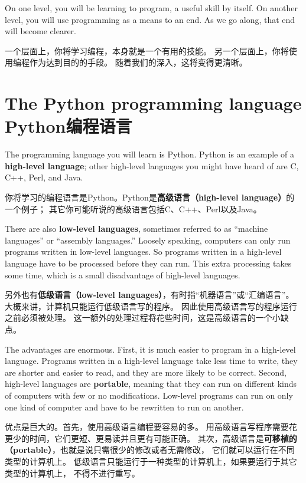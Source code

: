 \documentclass[10pt]{book}
\begin{document}
\begin{CJK}{UTF8}{gbsn}
On one level, you will be learning to program, a useful
skill by itself.  On another level, you will use programming as a means to
an end.  As we go along, that end will become clearer.

一个层面上，你将学习编程，本身就是一个有用的技能。
另一个层面上，你将使用编程作为达到目的的手段。
随着我们的深入，这将变得更清晰。

\section{The Python programming language Python编程语言}

The programming language you will learn is Python. Python is
an example of a {\bf high-level language}; other high-level languages
you might have heard of are C, C++, Perl, and Java.

你将学习的编程语言是Python。Python是{\bf 高级语言（high-level language）}的一个例子；
其它你可能听说的高级语言包括C、C++、Perl以及Java。

There are
also {\bf low-level languages}, sometimes referred to as ``machine
languages'' or ``assembly languages.''  Loosely speaking, computers
can only run programs written in low-level languages.  So
programs written in a high-level language have to be processed before
they can run.  This extra processing takes some time, which is a small
disadvantage of high-level languages.

另外也有{\bf 低级语言（low-level languages）}，有时指``机器语言''或``汇编语言''。
大概来讲，计算机只能运行低级语言写的程序。
因此使用高级语言写的程序运行之前必须被处理。
这一额外的处理过程将花些时间，这是高级语言的一个小缺点。

The advantages are enormous.  First, it is much easier to program
in a high-level language.  Programs written in a high-level language
take less time to write, they are shorter and easier to read, and they
are more likely to be correct.  Second, high-level languages are {\bf
portable}, meaning that they can run on different kinds of computers
with few or no modifications.  Low-level programs can run on only one
kind of computer and have to be rewritten to run on another.

优点是巨大的。首先，使用高级语言编程要容易的多。
用高级语言写程序需要花更少的时间，它们更短、更易读并且更有可能正确。
其次，高级语言是{\bf 可移植的（portable）}，也就是说只需很少的修改或者无需修改，
它们就可以运行在不同类型的计算机上。
低级语言只能运行于一种类型的计算机上，如果要运行于其它类型的计算机上，
不得不进行重写。


\end{CJK}
\end{document}
